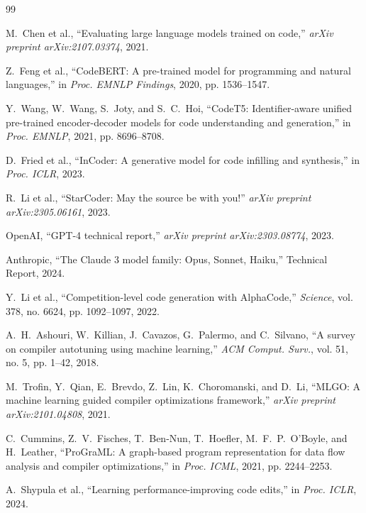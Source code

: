 \begin{thebibliography}{99}

M.~Chen et al., ``Evaluating large language models trained on code,'' \textit{arXiv preprint arXiv:2107.03374}, 2021.

Z.~Feng et al., ``CodeBERT: A pre-trained model for programming and natural languages,'' in \textit{Proc. EMNLP Findings}, 2020, pp. 1536--1547.

Y.~Wang, W.~Wang, S.~Joty, and S.~C.~Hoi, ``CodeT5: Identifier-aware unified pre-trained encoder-decoder models for code understanding and generation,'' in \textit{Proc. EMNLP}, 2021, pp. 8696--8708.

D.~Fried et al., ``InCoder: A generative model for code infilling and synthesis,'' in \textit{Proc. ICLR}, 2023.

R.~Li et al., ``StarCoder: May the source be with you!'' \textit{arXiv preprint arXiv:2305.06161}, 2023.

OpenAI, ``GPT-4 technical report,'' \textit{arXiv preprint arXiv:2303.08774}, 2023.

Anthropic, ``The Claude 3 model family: Opus, Sonnet, Haiku,'' Technical Report, 2024.

Y.~Li et al., ``Competition-level code generation with AlphaCode,'' \textit{Science}, vol. 378, no. 6624, pp. 1092--1097, 2022.

A.~H.~Ashouri, W.~Killian, J.~Cavazos, G.~Palermo, and C.~Silvano, ``A survey on compiler autotuning using machine learning,'' \textit{ACM Comput. Surv.}, vol. 51, no. 5, pp. 1--42, 2018.

M.~Trofin, Y.~Qian, E.~Brevdo, Z.~Lin, K.~Choromanski, and D.~Li, ``MLGO: A machine learning guided compiler optimizations framework,'' \textit{arXiv preprint arXiv:2101.04808}, 2021.

C.~Cummins, Z.~V.~Fisches, T.~Ben-Nun, T.~Hoefler, M.~F.~P.~O'Boyle, and H.~Leather, ``ProGraML: A graph-based program representation for data flow analysis and compiler optimizations,'' in \textit{Proc. ICML}, 2021, pp. 2244--2253.

A.~Shypula et al., ``Learning performance-improving code edits,'' in \textit{Proc. ICLR}, 2024.


\end{thebibliography}
